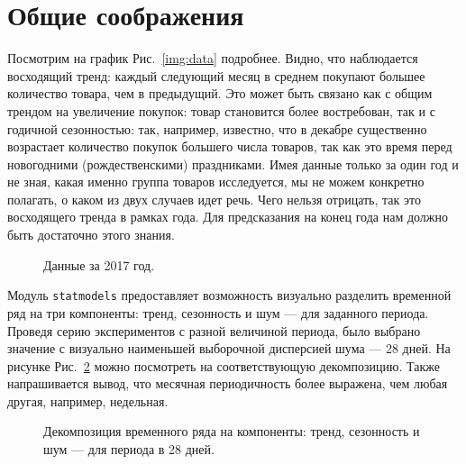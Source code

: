 \section{Общие соображения}

Посмотрим на график Рис.~\ref{img:data} подробнее.
Видно, что наблюдается восходящий тренд: каждый следующий месяц в среднем покупают большее количество товара, чем в предыдущий. Это может быть связано как с общим трендом на увеличение покупок: товар становится более востребован, так и с годичной сезонностью: так, например, известно, что в декабре существенно возрастает количество покупок большего числа товаров, так как это время перед новогодними (рождественскими) праздниками. Имея данные только за один год и не зная, какая именно группа товаров исследуется, мы не можем конкретно полагать, о каком из двух случаев идет речь. Чего нельзя отрицать, так это восходящего тренда в рамках года. Для предсказания на конец года нам должно быть достаточно этого знания.

\begin{figure}[h]
        \noindent{}
        \caption{Данные за 2017 год.}
        \label{img:common}
\end{figure}

Модуль \texttt{statmodels} предоставляет возможность визуально разделить временной ряд на три компоненты: тренд, сезонность и шум --- для заданного периода. Проведя серию экспериментов с разной величиной периода, было выбрано значение с визуально наименьшей выборочной дисперсией шума --- 28 дней. На рисунке Рис.~\ref{img:decomp} можно посмотреть на соответствующую декомпозицию. Также напрашивается вывод, что месячная периодичность более выражена, чем любая другая, например, недельная.

\begin{figure}[h]
        \noindent{}
        \caption{Декомпозиция временного ряда на компоненты: тренд, сезонность и шум --- для периода в 28 дней.}
        \label{img:decomp}
\end{figure}